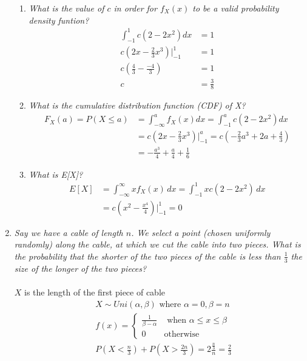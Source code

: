 \documentclass{article} %
\begin{document}
\begin{enumerate}
	\begin{enumerate}
		\item \textit{What is the value of $c$ in order for $f_X(x)$ to be a valid probability density funtion?}
		\begin{align*}
		\int_{-1}^{1} c(2 - 2x^2) dx &= 1\\
		c(2x - \frac{2}{3}x^3) \Big|_{-1}^{1} &= 1\\
		c(\frac{4}{3} - \frac{-4}{3}) &= 1\\
		c &= \frac{3}{8}
		\end{align*}
		
		\item \textit{What is the cumulative distribution function (CDF) of X?}
		\begin{align*}
		F_X(a) = P(X \leq a) &= \int_{-\infty}^{a} f_X(x)dx = \int_{-1}^{a} c(2 - 2x^2) dx\\
		&= c(2x - \frac{2}{3}x^3)\Big|_{-1}^{a} = c(-\frac{2}{3}a^3 + 2a + \frac{4}{3})\\
		&= -\frac{a^3}{4} + \frac{a}{4} + \frac{1}{6}
		\end{align*}
		
		\item \textit{What is E[X]?}
		\begin{align*}
		E[X] &= \int_{-\infty}^{\infty} xf_X(x)\,dx = \int_{-1}^{1} xc(2 - 2x^2)\,dx\\
		&= c(x^2 - \frac{x^4}{4})\Big|_{-1}^{1} = 0
		\end{align*}
	
	\end{enumerate}
	
	\item \textit{Say we have a cable of length $n$. We select a point (chosen uniformly randomly) along the cable, at which we cut the cable into two pieces. What is the probability that the shorter of the two pieces of the cable is less than $\frac{1}{3}$ the size of the longer of the two pieces?}\\
	\\
	$X$ is the length of the first piece of cable
	\begin{align*}
	&X \sim Uni(\alpha, \beta) \text{ where } \alpha = 0, \beta = n\\
	&f(x) =
		\begin{cases}
		\frac{1}{\beta - \alpha} &\text{ when } \alpha \leq x \leq \beta\\
		0 &\text{otherwise}
		\end{cases}\\
	&P(X < \frac{n}{3}) + P(X > \frac{2n}{3}) = 2\frac{\frac{n}{3}}{n} = \frac{2}{3}
	\end{align*}
	

\end{enumerate}
\end{document}
